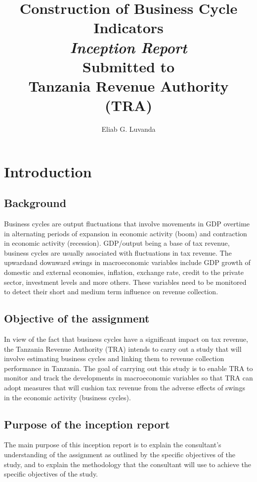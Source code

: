 \documentclass[12pt,a4paper,final]{article}
\author{Eliab G. Luvanda}
\title{Construction of Business Cycle Indicators \\
\textit{Inception Report} \\
Submitted to \\
\textbf{Tanzania Revenue Authority (TRA)}}
\begin{document}
\maketitle

\newpage
\tableofcontents

\newpage
\section{Introduction}

\subsection{Background}
Business cycles are output fluctuations that involve movements in GDP overtime in alternating periods of expansion in economic activity (boom) and contraction in economic activity (recession). GDP/output being a base of tax revenue, business cycles are usually associated with fluctuations in tax revenue.  The upwardand downward swings in macroeconomic variables include GDP growth of domestic  and external economies, inflation, exchange rate, credit to the private sector, investment levels and more others.  These variables need to be monitored to detect their short and medium term influence on revenue collection.

\subsection{Objective of the assignment}
In view of the fact that business cycles have a significant impact on tax revenue, the Tanzania Revenue Authority (TRA) intends to carry out a study that will involve estimating business cycles and linking them to revenue collection performance in Tanzania.  The goal of carrying out this study is to enable TRA to monitor and track the developments in macroeconomic variables so that TRA can adopt measures that will cushion tax revenue from the adverse effects of swings in the economic activity (business cycles).

\subsection{Purpose of the inception report}
The main purpose of this inception report is to explain the consultant's understanding of the assignment as outlined by the specific objectives of the study, and to explain the methodology that the consultant will use to achieve the specific objectives of the study.
\end{document}

